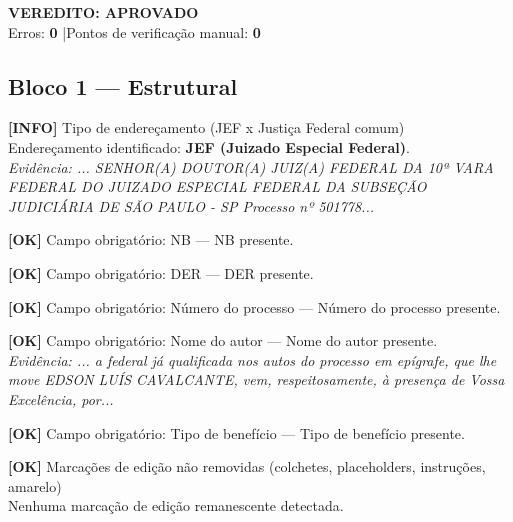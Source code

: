 \documentclass[12pt,a4paper]{article}
\newcommand{\statusOK}[1]{\textcolor{corOK}{\textbf{[OK]}} #1}
\newcommand{\statusINFO}[1]{\textcolor{corINFO}{\textbf{[INFO]}} #1}
\begin{document}
\vspace{0.5em}

\noindent\colorbox{corFundoAprovado}{%
  \begin{minipage}{\dimexpr\linewidth-2\fboxsep}
    \centering
    \vspace{0.3em}
    {\large \textcolor{corOK}{\textbf{VEREDITO: APROVADO}}}\\
    Erros: \textbf{0} \quad|\quad Pontos de verificação manual: \textbf{0}
    \vspace{0.3em}
  \end{minipage}%
}

\vspace{1em}


\subsection{Bloco 1 --- Estrutural}

\statusINFO{Tipo de endereçamento (JEF x Justiça Federal comum)}\\
Endereçamento identificado: \textbf{JEF (Juizado Especial Federal)}.\\
\textit{Evidência: ... SENHOR(A) DOUTOR(A) JUIZ(A) FEDERAL DA 10ª VARA FEDERAL DO JUIZADO ESPECIAL FEDERAL DA SUBSEÇÃO JUDICIÁRIA DE SÃO PAULO - SP Processo nº 501778...}

\medskip
\statusOK{Campo obrigatório: NB} --- NB presente.

\medskip
\statusOK{Campo obrigatório: DER} --- DER presente.

\medskip
\statusOK{Campo obrigatório: Número do processo} --- Número do processo presente.

\medskip
\statusOK{Campo obrigatório: Nome do autor} --- Nome do autor presente.\\
\textit{Evidência: ... a federal já qualificada nos autos do processo em epígrafe, que lhe move EDSON LUÍS CAVALCANTE, vem, respeitosamente, à presença de Vossa Excelência, por...}

\medskip
\statusOK{Campo obrigatório: Tipo de benefício} --- Tipo de benefício presente.

\medskip
\statusOK{Marcações de edição não removidas (colchetes, placeholders, instruções, amarelo)}\\
Nenhuma marcação de edição remanescente detectada.
\end{document}
